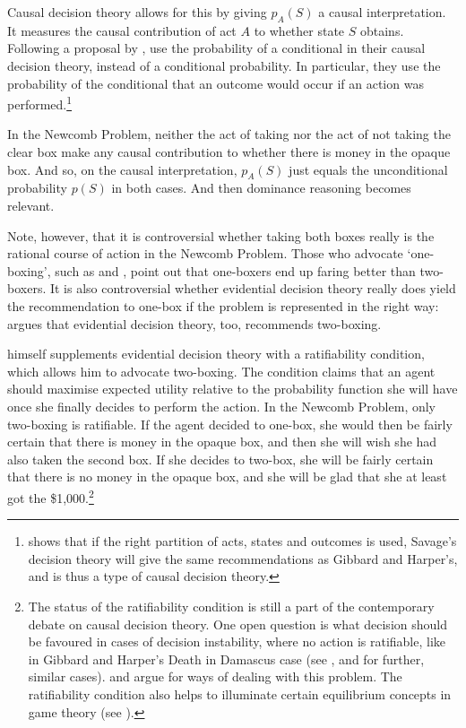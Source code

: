 Causal decision theory allows for this by giving $p_{A} (S)$ a causal interpretation. It measures the causal contribution of act $A$ to whether state $S$ obtains. Following a proposal by \citet{Stalnaker1972}, \citet{GibbardHarper1978} use the probability of a conditional in their causal decision theory, instead of a conditional probability. In particular, they use the probability of the conditional that an outcome would occur if an action was performed.\footnote{\citet{Lewis1981} shows that if the right partition of acts, states and outcomes is used, Savage's decision theory will give the same recommendations as Gibbard and Harper's, and is thus a type of causal decision theory.}

In the Newcomb Problem, neither the act of taking nor the act of not taking the clear box make any causal contribution to whether there is money in the opaque box. And so, on the causal interpretation, $p_{A} (S)$  just equals the unconditional probability $p (S)$ in both cases. And then dominance reasoning becomes relevant.

Note, however, that it is controversial whether taking both boxes really is the rational course of action in the Newcomb Problem. Those who advocate `one-boxing', such as \citet{Horgan1981} and \citet{Horwich1987}, point out that one-boxers end up faring better than two-boxers. It is also controversial whether evidential decision theory really does yield the recommendation to one-box if the problem is represented in the right way: \citet{Eells1981} argues that evidential decision theory, too, recommends two-boxing.

\citet{Jeffrey1983} himself supplements evidential decision theory with a ratifiability condition, which allows him to advocate two-boxing. The condition claims that an agent should maximise expected utility relative to the probability function she will have once she finally decides to perform the action. In the Newcomb Problem, only two-boxing is ratifiable. If the agent decided to one-box, she would then be fairly certain that there is money in the opaque box, and then she will wish she had also taken the second box. If she decides to two-box, she will be fairly certain that there is no money in the opaque box, and she will be glad that she at least got the \$1,000.\footnote{The status of the ratifiability condition is still a part of the contemporary debate on causal decision theory. One open question is what decision should be favoured in cases of decision instability, where no action is ratifiable, like in Gibbard and Harper's Death in Damascus case (see \citet{GibbardHarper1978}, and \citet{Egan2007} for further, similar cases). \citet{Arntzenius2008} and \citet{Joyce2012} argue for ways of dealing with this problem. The ratifiability condition also helps to illuminate certain equilibrium concepts in game theory (see \citet{JoyceGibbard1998}).}

